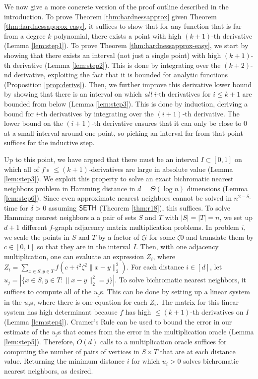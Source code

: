 We now give a more concrete version of the proof outline described in the introduction. To prove Theorem \ref{thm:hardnessapprox} given Theorem \ref{thm:hardnessapprox-easy}, it suffices to show that for any function that is far from a degree $k$ polynomial, there exists a point with high $(k+1)$-th derivative (Lemma \ref{lem:step1}). To prove Theorem \ref{thm:hardnessapprox-easy}, we start by showing that there exists an interval (not just a single point) with high $(k+1)$-th derivative (Lemma \ref{lem:step2}). This is done by integrating over the $(k+2)$-nd derivative, exploiting the fact that it is bounded for analytic functions (Proposition \ref{prop:derivs}). Then, we further improve this derivative lower bound by showing that there is an interval on which \emph{all} $i$-th derivatives for $i\le k+1$ are bounded from below (Lemma \ref{lem:step3}). This is done by induction, deriving a bound for $i$-th derivatives by integrating over the $(i+1)$-th derivative. The lower bound on the $(i+1)$-th derivative ensures that it can only be close to 0 at a small interval around one point, so picking an interval far from that point suffices for the inductive step.

Up to this point, we have argued that there must be an interval $I\subset [0,1]$ on which all of $f$'s $\le (k+1)$-derivatives are large in absolute value (Lemma \ref{lem:step3}). We exploit this property to solve an exact bichromatic nearest neighbors problem in Hamming distance in $d = \Theta(\log n)$ dimensions (Lemma \ref{lem:step6}). Since even approximate nearest neighbors cannot be solved in $n^{2 - \delta}$-time for $\delta > 0$ assuming $\mathsf{SETH}$ (Theorem \ref{thm:r18}), this suffices. To solve Hamming nearest neighbors a a pair of sets $S$ and $T$ with $|S| = |T| = n$, we set up $d+1$ different $f$-graph adjacency matrix multiplication problems. In problem $i$, we scale the points in $S$ and $T$ by a factor of $\zeta i$ for some $\zeta  0$ and translate them by $c \in [0,1]$ so that they are in the interval $I$. Then, with one adjacency multiplication, one can evaluate an expression $Z_i$, where $Z_i = \sum_{x\in S, y\in T} f(c + i^2\zeta^2 \|x - y\|_2^2)$. For each distance $i\in [d]$, let $u_j = |\{x\in S, y\in T: \|x - y\|_2^2 = j\}|$. To solve bichromatic nearest neighbors, it suffices to compute all of the $u_j$s. This can be done by setting up a linear system in the $u_j$s, where there is one equation for each $Z_i$. The matrix for this linear system has high determinant because $f$ has high $\le (k+1)$-th derivatives on $I$ (Lemma \ref{lem:step4}). Cramer's Rule can be used to bound the error in our estimate of the $u_j$s that comes from the error in the multiplication oracle (Lemma \ref{lem:step5}). Therefore, $O(d)$ calls to a multiplication oracle suffices for computing the number of pairs of vertices in $S\times T$ that are at each distance value. Returning the minimum distance $i$ for which $u_i > 0$ solves bichromatic nearest neighbors, as desired.

